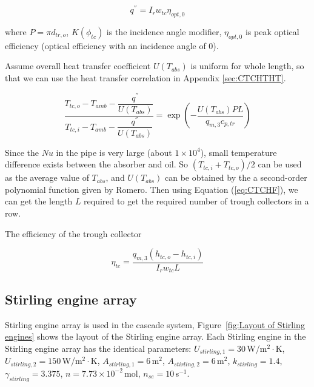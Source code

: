 \documentclass{article}
\begin{document}
\begin{equation*}
	q^{''}=I_rw_{tc}\eta_{opt,0}
\end{equation*}

where $P=\pi{}d_{{tr,o}}$, $K(\phi_{tc})$ is the incidence angle modifier, $\eta_{opt,0}$
is peak optical efficiency (optical efficiency with an incidence angle of 0).

Assume overall heat transfer coefficient $U(T_{abs})$ is uniform for whole length, so that we can use the heat transfer correlation in Appendix \ref{sec:CTCHTHT}.

\begin{equation}
	\frac{T_{tc,o}-T_{amb}-\dfrac{q^{''}}{U(T_{abs})}}{T_{tc,i}-T_{amb}-\dfrac{q^{''}}{U(T_{abs})}}=\exp(-\frac{U(T_{abs})PL}{q_{m,3}c_{p,tr}})\label{eq:CTCHF}
\end{equation}

Since the $Nu$ in the pipe is very large (about $1\times10^4$), small temperature difference exists between the absorber and oil. So $(T_{tc,i}+T_{tc,o})/2$ can be used as the average value of $T_{abs}$, and $U(T_{abs})$ can be obtained by the a second-order polynomial function given by Romero\cite{Romero2007}. Then using Equation (\ref{eq:CTCHF}), we can get the length $L$ required to get the required number of trough collectors in a row.

The efficiency of the trough collector

\begin{equation*}
	\eta_{tc}=\frac{q_{m,3}(h_{tc,o}-h_{tc,i})}{I_rw_{tc}L}
\end{equation*}

\subsection{Stirling engine array}

Stirling engine array is used in the cascade system, Figure~\ref{fig:Layout of Stirling engines} shows the layout of the Stirling engine array. Each Stirling engine in the Stirling engine array has the identical parameters: $U_{stirling,1}=30\,$W/m$^2\cdot$K, $U_{stirling,2}=150\,$W/m$^2\cdot$K, $A_{stirling,1}=6\,$m$^2$, $A_{stirling,2}=6\,$m$^2$, $k_{stirling}=1.4$, $\gamma_{stirling}=3.375$, $n=7.73\times{}10^{-2}\,$mol, $n_{se}=10\,$s$^{-1}$.
\end{document}
